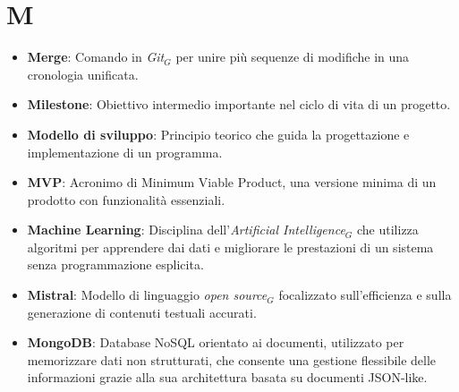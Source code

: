 \section{M}
\begin{itemize}
    \item \textbf{Merge}: Comando in \textit{Git}$_G$ per unire più sequenze di modifiche in una cronologia unificata.
    \item \textbf{Milestone}: Obiettivo intermedio importante nel ciclo di vita di un progetto.
    \item \textbf{Modello di sviluppo}: Principio teorico che guida la progettazione e implementazione di un programma.
    \item \textbf{MVP}: Acronimo di Minimum Viable Product, una versione minima di un prodotto con funzionalità essenziali.
    \item \textbf{Machine Learning}: Disciplina dell'\textit{Artificial Intelligence}$_G$ che utilizza algoritmi per apprendere dai dati e migliorare le prestazioni di un sistema senza programmazione esplicita.
    \item \textbf{Mistral}: Modello di linguaggio \textit{open source}$_G$ focalizzato sull'efficienza e sulla generazione di contenuti testuali accurati.
    \item \textbf{MongoDB}: Database NoSQL orientato ai documenti, utilizzato per memorizzare dati non strutturati, che consente una gestione flessibile delle informazioni grazie alla sua architettura basata su documenti JSON-like.
\end{itemize}
